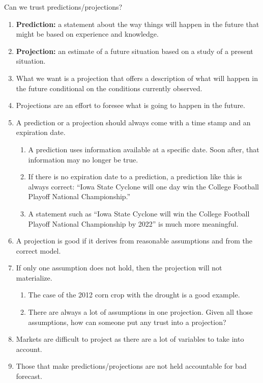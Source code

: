 \documentclass[table,xcolor=pdftex,dvipsnames, handout]{beamer}\usepackage[]{graphicx}\usepackage[]{color}
\begin{document}
\begin{frame}[allowframebreaks]{Can we trust predictions/projections?}
\begin{enumerate}[label=\textbullet]
  \item \textbf{Prediction:} a statement about the way things will happen in the future that might be based on experience and knowledge.
  \item \textbf{Projection:} an estimate of a future situation based on a study of a present situation.
  \item What we want is a projection that offers a description of what will happen in the future conditional on the conditions currently observed.
  \item Projections are an effort to foresee what is going to happen in the future.
  \framebreak
  \item A prediction or a projection should always come with a time stamp and an expiration date.
        \begin{enumerate}[label=-]
         \item A prediction uses information available at a specific date. Soon after, that information may no longer be true.
         \item If there is no expiration date to a prediction, a prediction like this is always correct: ``Iowa State Cyclone will one day win the College Football Playoff National Championship.''
         \item A statement such as ``Iowa State Cyclone will win the College Football Playoff National Championship by 2022'' is much more meaningful.
        \end{enumerate}
  \item A projection is good if it derives from reasonable assumptions and from the correct model.
  \pagebreak
  \item If only one assumption does not hold, then the projection will not materialize.
        \begin{enumerate}[label=-]
         \item The case of the 2012 corn crop with the drought is a good example.
         \item There are always a lot of assumptions in one projection. Given all those assumptions, how can someone put any trust into a projection?
        \end{enumerate}
  \item Markets are difficult to project as there are a lot of variables to take into account.
  \framebreak
  \item Those that make predictions/projections are not held accountable for bad forecast.

\end{enumerate}
\end{frame}
\end{document}

